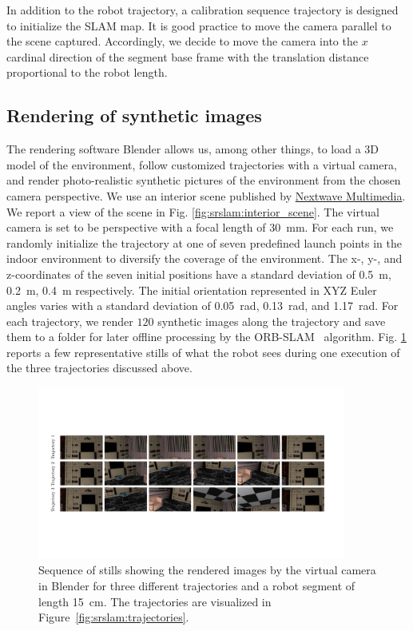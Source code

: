 In addition to the robot trajectory, a calibration sequence trajectory is designed to initialize the \gls{SLAM} map. 
It is good practice to move the camera parallel to the scene captured. Accordingly, we decide to move the camera into the $x$ cardinal direction of the segment base frame with the translation distance proportional to the robot length.

\subsection{Rendering of synthetic images}
The rendering software Blender allows us, among other things, to load a 3D model of the environment, follow customized trajectories with a virtual camera, and render photo-realistic synthetic pictures of the environment from the chosen camera perspective. We use an interior scene published by \href{https://www.nextwavemultimedia.com/html/3dblendermodel.html}{Nextwave Multimedia}. We report a view of the scene in Fig. \ref{fig:srslam:interior_scene}.
The virtual camera is set to be perspective with a focal length of \SI{30}{mm}.
For each run, we randomly initialize the trajectory at one of seven predefined launch points in the indoor environment to diversify the coverage of the environment.
The x-, y-, and z-coordinates of the seven initial positions have a standard deviation of \SI{0.5}{m}, \SI{0.2}{m}, \SI{0.4}{m} respectively. The initial orientation represented in XYZ Euler angles varies with a standard deviation of \SI{0.05}{rad}, \SI{0.13}{rad}, and \SI{1.17}{rad}.
For each trajectory, we render $120$ synthetic images along the trajectory and save them to a folder for later offline processing by the ORB-SLAM~\citep{mur2017orb} algorithm. Fig. \ref{fig:srslam:sequences_of_stills_simulations_cropped} reports a few representative stills of what the robot sees during one execution of the three trajectories discussed above.

\begin{figure}
    \centering
    \includegraphics[width=0.9\textwidth]{srslam/figures/graphic_sequences_of_stills_simulations_compressed.pdf}
    \caption{Sequence of stills showing the rendered images by the virtual camera in Blender for three different trajectories and a robot segment of length \SI{15}{cm}. The trajectories are visualized in Figure~\ref{fig:srslam:trajectories}.}
    \label{fig:srslam:sequences_of_stills_simulations_cropped}
\end{figure}

